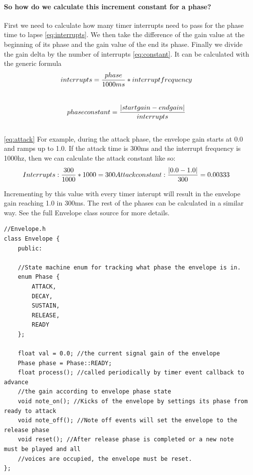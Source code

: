 \documentclass[acmlarge,screen]{acmart}
\begin{document}
	\paragraph{So how do we calculate this increment constant for a phase?} First we need to calculate how many timer interrupts need to pass for the phase time to lapse \eqref{eq:interrupts}. We then take the difference of the gain value at the beginning of its phase and the gain value of the end its phase. Finally we divide the gain delta by the number of interrupts \eqref{eq:constant}. It can be calculated with the generic formula  \\
		
	\begin{equation}
		\large
		interrupts=\frac{phase}{1000ms} * interrupt frequency
		\label{eq:interrupts}
	\end{equation}\\

	\begin{equation}
		\large
		phase constant = \frac{|start gain - end gain|}{interrupts}
		\label{eq:constant}
	\end{equation}\\

	
	\eqref{eq:attack} For example, during the attack phase, the envelope gain starts at 0.0 and ramps up to 1.0. If the attack time is 300ms and the interrupt frequency is 1000hz, then we can calculate the attack constant like so:\\
	
	\begin{equation}
		\large
		Interrupts: \frac{300}{1000}*1000=300
		Attack constant: \frac{|0.0 - 1.0|}{300}=0.00333
		\label{eq:attack}
	\end{equation}
	
	
	Incrementing by this value with every timer interupt will result in the envelope gain reaching 1.0 in 300ms. The rest of the phases can be calculated in a similar way. See the full Envelope class source for more details.
	
	\begin{verbatim}
//Envelope.h
class Envelope {
	public:
	
	//State machine enum for tracking what phase the envelope is in.
	enum Phase {
		ATTACK,
		DECAY,
		SUSTAIN,
		RELEASE,
		READY 
	};
	
	float val = 0.0; //the current signal gain of the envelope
	Phase phase = Phase::READY;
	float process(); //called periodically by timer event callback to advance
	//the gain according to envelope phase state
	void note_on(); //Kicks of the envelope by settings its phase from ready to attack
	void note_off(); //Note off events will set the envelope to the release phase
	void reset(); //After release phase is completed or a new note must be played and all
	//voices are occupied, the envelope must be reset.
};
	\end{verbatim}
	
\end{document}
